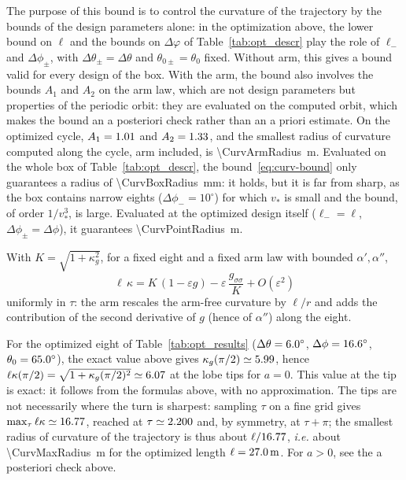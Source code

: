 The purpose of this bound is to control the curvature of the trajectory by the bounds of the design parameters alone: in the optimization above, the lower bound on \(\ell\) and the bounds on \(\Delta\varphi\) of Table~\ref{tab:opt_descr} play the role of \(\ell_-\) and \(\Delta\phi_\pm\), with \(\Delta\theta_\pm = \Delta\theta\) and \(\theta_{0\pm} = \theta_0\) fixed.
Without arm, this gives a bound valid for every design of the box.
With the arm, the bound also involves the bounds \(A_1\) and \(A_2\) on the arm law, which are not design parameters but properties of the periodic orbit: they are evaluated on the computed orbit, which makes the bound an a posteriori check rather than an a priori estimate.
On the optimized cycle, \(A_1 = 1.01\) and \(A_2 = 1.33\), and the smallest radius of curvature computed along the cycle, arm included, is \SI{\CurvArmRadius}{\meter}.
Evaluated on the whole box of Table~\ref{tab:opt_descr}, the bound~\eqref{eq:curv-bound} only guarantees a radius of \SI{\CurvBoxRadius}{\milli\meter}: it holds, but it is far from sharp, as the box contains narrow eights (\(\Delta\phi_- = 10^\circ\)) for which \(v_*\) is small and the bound, of order \(1/v_*^3\), is large.
Evaluated at the optimized design itself (\(\ell_- = \ell\), \(\Delta\phi_\pm = \Delta\phi\)), it guarantees \SI{\CurvPointRadius}{\meter}.

With \(K = \sqrt{1+\kappa_g^2}\), for a fixed eight and a fixed arm law with bounded \(\alpha',\alpha''\),
\begin{equation} \label{eq:curv-first-order}
    \ell\,\kappa = K\,(1-\varepsilon g) - \varepsilon\,\frac{g_{\sigma\sigma}}{K} + O(\varepsilon^2)
\end{equation}
uniformly in \(\tau\): the arm rescales the arm-free curvature by \(\ell/r\) and adds the contribution of the second derivative of \(g\) (hence of \(\alpha''\)) along the eight.

For the optimized eight of Table~\ref{tab:opt_results} (\(\Delta\theta=6.0^\circ\), \(\Delta\phi=16.6^\circ\), \(\theta_0=65.0^\circ\)), the exact value above gives \(\kappa_g(\pi/2)\simeq5.99\), hence \(\ell\kappa(\pi/2) = \sqrt{1+\kappa_g(\pi/2)^2} \simeq 6.07\) at the lobe tips for \(a=0\).
This value at the tip is exact: it follows from the formulas above, with no approximation.
The tips are not necessarily where the turn is sharpest: sampling \(\tau\) on a fine grid gives \(\max_\tau\ell\kappa\simeq16.77\), reached at \(\tau\simeq2.200\) and, by symmetry, at \(\tau+\pi\); the smallest radius of curvature of the trajectory is thus about \(\ell/16.77\), \emph{i.e.} about \SI{\CurvMaxRadius}{\meter} for the optimized length \(\ell=\SI{27.0}{\meter}\).
For \(a>0\), see the a posteriori check above.


